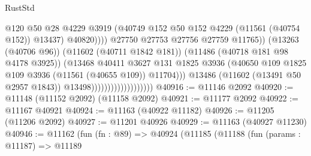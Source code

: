 \begin{lexlean}{RustStd}
\begin{coremodule}
                                                        @120
                                                        @50
                                                        @28
                                                        @4229
                                                        @3919
                                                        (@40749
                                                          @152
                                                          @50
                                                          @152
                                                          @4229
                                                          (@11561 (@40754 @152))
                                                          @13437)
                                                        @40820))))
                                                @27750
                                                @27753
                                                @27756
                                                @27759
                                                @11765))
                                            (@13263 (@40706 @96))
                                            (@11602 (@40711 @1842 @181))
                                            (@11486 (@40718 @181 @98 @4178 @3925))
                                            (@13468
                                              @40411
                                              @3627
                                              @131
                                              @1825
                                              @3936
                                              (@40650
                                                @109
                                                @1825
                                                @109
                                                @3936
                                                (@11561 (@40655 @109))
                                                @11704)))
                                          @13486
                                          (@11602 (@13491 @50 @2957 @1843))
                                          @13498)))))))))))))))))))
@40916 := @11146 @2092
@40920 := @11148 (@11152 @2092) (@11158 @2092)
@40921 := @11177 @2092
@40922 := @11167 @40921
@40924 := @11163 (@40922 @11182)
@40926 := @11205 (@11206 @2092)
@40927 := @11201 @40926
@40929 := @11163 (@40927 @11230)
@40946 := @11162
    (fun (fn : @89) =>
    @40924
      (@11185
        (@11188
          (fun (params : @11187) =>
          @11189

\end{coremodule}
\end{lexlean}
